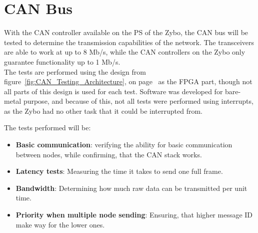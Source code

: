 
\section{CAN Bus}
\label{sub:CAN_Bus_Tests}
With the CAN controller available on the PS of the Zybo, the CAN bus will be tested to determine the transmission capabilities of the network.
The transceivers are able to work at up to 8 Mb/s, while the CAN controllers on the Zybo only guarantee functionality up to 1 Mb/s. \\

The tests are performed using the design from figure~\ref{fig:CAN_Testing_Architecture}, on page~\pageref{fig:CAN_Testing_Architecture} as the FPGA part, though not all parts of this design is used for each test.
Software was developed for bare-metal purpose, and because of this, not all tests were performed using interrupts, as the Zybo had no other task that it could be interrupted from.

The tests performed will be: 
\begin{itemize}
	\item \textbf{Basic communication}: verifying the ability for basic communication between nodes, while confirming, that the CAN stack works.
	\item \textbf{Latency tests}: Measuring the time it takes to send one full frame.
	\item \textbf{Bandwidth}: Determining how much raw data can be transmitted per unit time.
	\item \textbf{Priority when multiple node sending}: Ensuring, that higher message ID make way for the lower ones.
\end{itemize}

